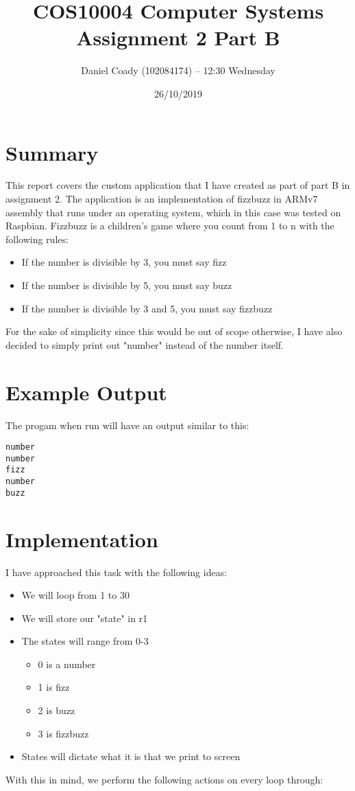 \documentclass[11pt]{scrartcl}
\title{COS10004 Computer Systems Assignment 2 Part B}
\author{Daniel Coady (102084174) -- 12:30 Wednesday}
\date{26/10/2019}
\begin{document}
\maketitle

\pagebreak

\section*{Summary}
This report covers the custom application that I have created as part of
part B in assignment 2. The application is an implementation of fizzbuzz
in ARMv7 assembly that runs under an operating system, which in this case
was tested on Raspbian. Fizzbuzz is a children's game where you count from
1 to n with the following rules:
\begin{itemize}
    \item If the number is divisible by 3, you must say fizz
    \item If the number is divisible by 5, you must say buzz
    \item If the number is divisible by 3 and 5, you must say fizzbuzz
\end{itemize}
For the sake of simplicity since this would be out of scope otherwise,
I have also decided to simply print out "number" instead of the number
itself.

\section*{Example Output}
The progam when run will have an output similar to this:
\begin{verbatim}
number
number
fizz
number
buzz
\end{verbatim}

\section*{Implementation}
I have approached this task with the following ideas:
\begin{itemize}
    \item We will loop from 1 to 30
    \item We will store our "state" in r1
    \item The states will range from 0-3
    \begin{itemize}
        \item 0 is a number
        \item 1 is fizz
        \item 2 is buzz
        \item 3 is fizzbuzz
    \end{itemize}
    \item States will dictate what it is that we print to screen
\end{itemize}
With this in mind, we perform the following actions on every loop through:
\end{document}

